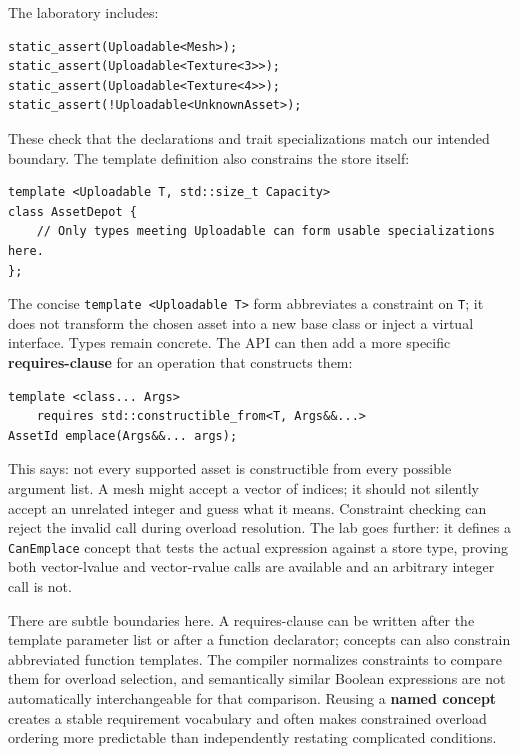 The laboratory includes:

\begin{verbatim}
static_assert(Uploadable<Mesh>);
static_assert(Uploadable<Texture<3>>);
static_assert(Uploadable<Texture<4>>);
static_assert(!Uploadable<UnknownAsset>);
\end{verbatim}

These check that the declarations and trait specializations match our intended boundary. The template definition also constrains the store itself:

\begin{verbatim}
template <Uploadable T, std::size_t Capacity>
class AssetDepot {
    // Only types meeting Uploadable can form usable specializations here.
};
\end{verbatim}

The concise \texttt{template\ \textless{}Uploadable\ T\textgreater{}} form abbreviates a constraint on \texttt{T}; it does not transform the chosen asset into a new base class or inject a virtual interface. Types remain concrete. The API can then add a more specific \textbf{requires-clause} for an operation that constructs them:

\begin{verbatim}
template <class... Args>
    requires std::constructible_from<T, Args&&...>
AssetId emplace(Args&&... args);
\end{verbatim}

This says: not every supported asset is constructible from every possible argument list. A mesh might accept a vector of indices; it should not silently accept an unrelated integer and guess what it means. Constraint checking can reject the invalid call during overload resolution. The lab goes further: it defines a \texttt{CanEmplace} concept that tests the actual expression against a store type, proving both vector-lvalue and vector-rvalue calls are available and an arbitrary integer call is not.

There are subtle boundaries here. A requires-clause can be written after the template parameter list or after a function declarator; concepts can also constrain abbreviated function templates. The compiler normalizes constraints to compare them for overload selection, and semantically similar Boolean expressions are not automatically interchangeable for that comparison. Reusing a \textbf{named concept} creates a stable requirement vocabulary and often makes constrained overload ordering more predictable than independently restating complicated conditions.

